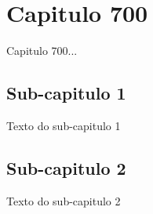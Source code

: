 
\chapter{Capitulo 700}

Capitulo 700...


\section{Sub-capitulo 1}
Texto do sub-capitulo 1

\section{Sub-capitulo 2}
Texto do sub-capitulo 2

